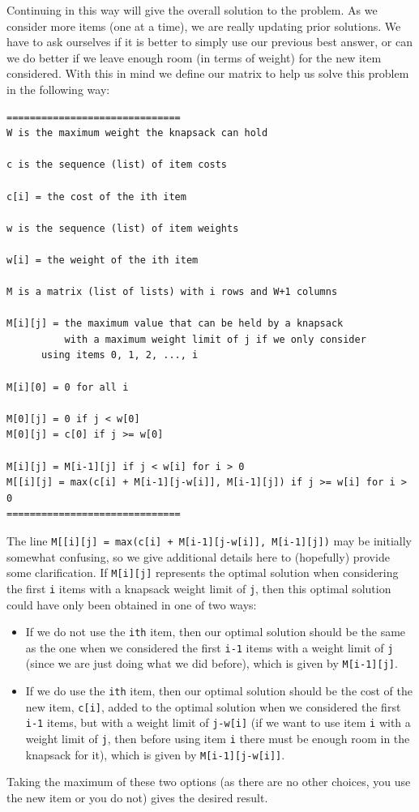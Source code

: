 \documentclass{ximera}
\begin{document}
Continuing in this way will give the overall solution to the problem. As we consider more items (one at a time), we are really updating prior solutions. We have to ask ourselves if it is better to simply use our previous best answer, or can we do better if we leave enough room (in terms of weight) for the new item considered. With this in mind we define our matrix to help us solve this problem in the following way:

\begin{verbatim}
==============================
W is the maximum weight the knapsack can hold

c is the sequence (list) of item costs

c[i] = the cost of the ith item

w is the sequence (list) of item weights

w[i] = the weight of the ith item

M is a matrix (list of lists) with i rows and W+1 columns

M[i][j] = the maximum value that can be held by a knapsack
          with a maximum weight limit of j if we only consider
	  using items 0, 1, 2, ..., i

M[i][0] = 0 for all i

M[0][j] = 0 if j < w[0]
M[0][j] = c[0] if j >= w[0]

M[i][j] = M[i-1][j] if j < w[i] for i > 0
M[[i][j] = max(c[i] + M[i-1][j-w[i]], M[i-1][j]) if j >= w[i] for i > 0
==============================
\end{verbatim}
The line \verb|M[[i][j] = max(c[i] + M[i-1][j-w[i]], M[i-1][j])| may be initially somewhat confusing, so we give additional details here to (hopefully) provide some clarification. If \verb|M[i][j]| represents the optimal solution when considering the first \verb|i| items with a knapsack weight limit of \verb|j|, then this optimal solution could have only been obtained in one of two ways:
\begin{itemize}
	\item If we do not use the \verb|ith| item, then our optimal solution should be the same as the one when we considered the first \verb|i-1| items with a weight limit of \verb|j| (since we are just doing what we did before), which is given by \verb|M[i-1][j]|.
	\item If we do use the \verb|ith| item, then our optimal solution should be the cost of the new item, \verb|c[i]|, added to the optimal solution when we considered the first \verb|i-1| items, but with a weight limit of \verb|j-w[i]| (if we want to use item \verb|i| with a weight limit of \verb|j|, then before using item \verb|i| there must be enough room in the knapsack for it), which is given by \verb|M[i-1][j-w[i]]|.
\end{itemize}
Taking the maximum of these two options (as there are no other choices, you use the new item or you do not) gives the desired result.
\end{document}
